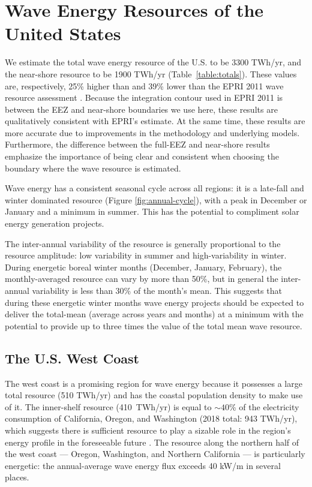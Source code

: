 \section{Wave Energy Resources of the United States}
\label{sec:results}

We estimate the total wave energy resource of the U.S. to be 3300 TWh/yr, and the near-shore resource to be 1900 TWh/yr (Table~\ref{table:totals}). 
These values are, respectively, 25\% higher than and 39\% lower than the EPRI 2011 wave resource assessment \citep[][]{EPRIwaveresource2011}. 
Because the integration contour used in EPRI 2011 is between the EEZ and near-shore boundaries we use here, these results are qualitatively consistent with EPRI's estimate. 
At the same time, these results are more accurate due to improvements in the methodology and underlying models. Furthermore, the difference between the full-EEZ and near-shore results emphasize the importance of being clear and consistent when choosing the boundary where the wave resource is estimated.

Wave energy has a consistent seasonal cycle across all regions: it is a late-fall and winter dominated resource (Figure \ref{fig:annual-cycle}), with a peak in December or January and a minimum in summer. This has the potential to compliment solar energy generation projects. 

The inter-annual variability of the resource is generally proportional to the resource amplitude: low variability in summer and high-variability in winter. During energetic boreal winter months (December, January, February), the monthly-averaged resource can vary by more than 50\%, but in general the inter-annual variability is less than 30\% of the month's mean. This suggests that during these energetic winter months wave energy projects should be expected to deliver the total-mean (average across years and months) at a minimum with the potential to provide up to three times the value of the total mean wave resource.

\subsection{The U.S. West Coast}

The west coast is a promising region for wave energy because it possesses a large total resource (510 TWh/yr) and has the coastal population density to make use of it. The inner-shelf resource (410~TWh/yr) is equal to $\sim40$\% of the electricity consumption of California, Oregon, and Washington (2018 total: 943 TWh/yr), which suggests there is sufficient resource to play a sizable role in the region's energy profile in the foreseeable future \citep{energyinformationadministrationStateEnergyConsumption2020}. The resource along the northern half of the west coast — Oregon, Washington, and Northern California — is particularly energetic: the annual-average wave energy flux exceeds 40 kW/m in several places.

